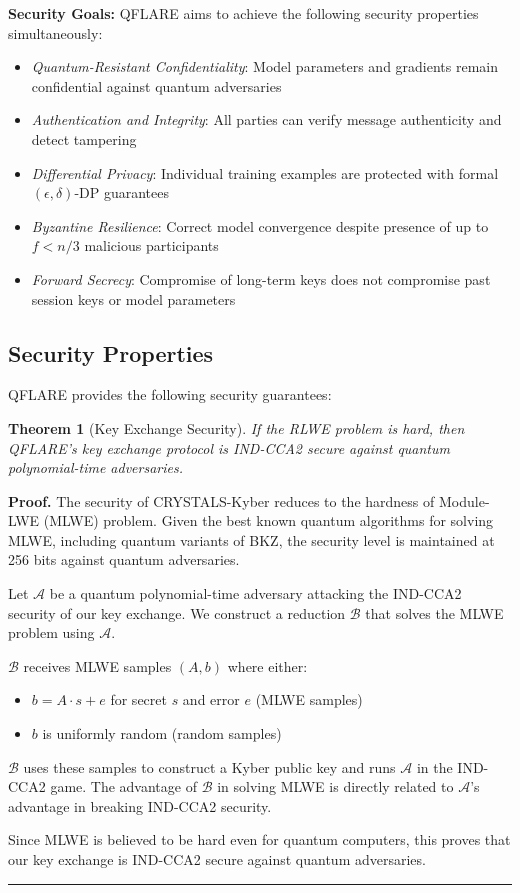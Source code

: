 \documentclass[journal,onecolumn]{IEEEtran}
\newtheorem{theorem}{Theorem}
\newenvironment{proof}[1][Proof]{\noindent\textbf{#1.} }{\ \rule{0.5em}{0.5em}}
\begin{document}
\textbf{Security Goals:} QFLARE aims to achieve the following security properties simultaneously:

\begin{itemize}
\item \textit{Quantum-Resistant Confidentiality}: Model parameters and gradients remain confidential against quantum adversaries
\item \textit{Authentication and Integrity}: All parties can verify message authenticity and detect tampering
\item \textit{Differential Privacy}: Individual training examples are protected with formal $(\epsilon, \delta)$-DP guarantees
\item \textit{Byzantine Resilience}: Correct model convergence despite presence of up to $f < n/3$ malicious participants
\item \textit{Forward Secrecy}: Compromise of long-term keys does not compromise past session keys or model parameters
\end{itemize}

\subsection{Security Properties}

QFLARE provides the following security guarantees:

\begin{theorem}[Key Exchange Security]
If the RLWE problem is hard, then QFLARE's key exchange protocol is IND-CCA2 secure against quantum polynomial-time adversaries.
\end{theorem}

\begin{proof}
The security of CRYSTALS-Kyber reduces to the hardness of Module-LWE (MLWE) problem. Given the best known quantum algorithms for solving MLWE, including quantum variants of BKZ, the security level is maintained at 256 bits against quantum adversaries.

Let $\mathcal{A}$ be a quantum polynomial-time adversary attacking the IND-CCA2 security of our key exchange. We construct a reduction $\mathcal{B}$ that solves the MLWE problem using $\mathcal{A}$.

$\mathcal{B}$ receives MLWE samples $(A, b)$ where either:
\begin{itemize}
\item $b = A \cdot s + e$ for secret $s$ and error $e$ (MLWE samples)
\item $b$ is uniformly random (random samples)
\end{itemize}

$\mathcal{B}$ uses these samples to construct a Kyber public key and runs $\mathcal{A}$ in the IND-CCA2 game. The advantage of $\mathcal{B}$ in solving MLWE is directly related to $\mathcal{A}$'s advantage in breaking IND-CCA2 security.

Since MLWE is believed to be hard even for quantum computers, this proves that our key exchange is IND-CCA2 secure against quantum adversaries.
\end{proof}
\end{document}
